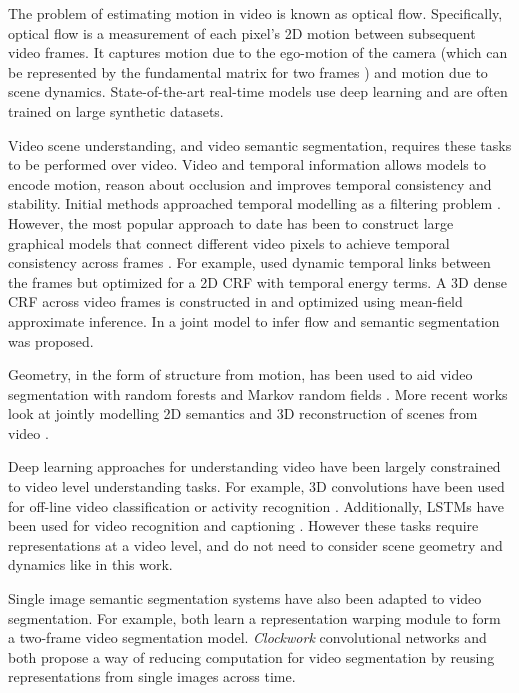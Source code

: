 The problem of estimating motion in video is known as optical flow. Specifically, optical flow is a measurement of each pixel's 2D motion between subsequent video frames. It captures motion due to the ego-motion of the camera (which can be represented by the fundamental matrix for two frames \citep{hartley2000}) and motion due to scene dynamics. State-of-the-art real-time models use deep learning \citep{dosovitskiy2015flownet,flownet2} and are often trained on large synthetic datasets.

Video scene understanding, and video semantic segmentation, requires these tasks to be performed over video. Video and temporal information allows models to encode motion, reason about occlusion and improves temporal consistency and stability. Initial methods approached temporal modelling as a filtering problem \citep{miksik2013efficient}.
However, the most popular approach to date has been to construct large graphical models that connect different video pixels to achieve temporal consistency across frames \citep{de2012line,chen2011temporally,tripathi2015semantic,hur2016joint}. For example,\citep{chen2011temporally} used dynamic temporal links between the frames but optimized for a 2D CRF with temporal energy terms.
A 3D dense CRF across video frames is constructed in \citep{tripathi2015semantic} and optimized using mean-field approximate inference. In \citep{hur2016joint} a joint model to infer flow and semantic segmentation was proposed.

Geometry, in the form of structure from motion, has been used to aid video segmentation with random forests \citep{brostow2008segmentation} and Markov random fields \citep{tighe2013superparsing}.
More recent works look at jointly modelling 2D semantics and 3D reconstruction of scenes from video \citep{kundu2014joint,sengupta2013urban}.

Deep learning approaches for understanding video have been largely constrained to video level understanding tasks. For example, 3D convolutions have been used for off-line video classification \citep{karpathy2014large} or activity recognition \citep{ji20133d}. Additionally, LSTMs have been used for video recognition and captioning \citep{donahue2015long}. However these tasks require representations at a video level, and do not need to consider scene geometry and dynamics like in this work.

Single image semantic segmentation systems have also been adapted to video segmentation. For example, \citep{zhu2017deep,gadde2017semantic} both learn a representation warping module to form a two-frame video segmentation model. \textit{Clockwork} convolutional networks \citep{shelhamer2016clockwork} and \citep{zhu2017deep} both propose a way of reducing computation for video segmentation by reusing representations from single images across time.

